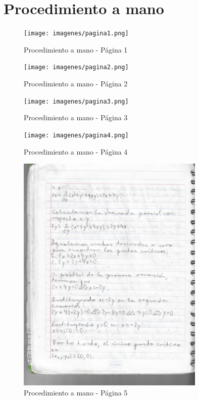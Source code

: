 \documentclass{article}
\begin{document}
\section*{Procedimiento a mano}

\begin{figure}[H]
	\centering
	\texttt{[image: imagenes/pagina1.png]}
	\caption{Procedimiento a mano - Página 1}
	\label{fig:procedimiento_1}
\end{figure}

\begin{figure}[H]
	\centering
	\texttt{[image: imagenes/pagina2.png]}
	\caption{Procedimiento a mano - Página 2}
	\label{fig:procedimiento_2}
\end{figure}

\begin{figure}[H]
	\centering
	\texttt{[image: imagenes/pagina3.png]}
	\caption{Procedimiento a mano - Página 3}
	\label{fig:procedimiento_3}
\end{figure}

\begin{figure}[H]
	\centering
	\texttt{[image: imagenes/pagina4.png]}
	\caption{Procedimiento a mano - Página 4}
	\label{fig:procedimiento_4}
\end{figure}

\begin{figure}[H]
	\centering
	\includegraphics[width=0.8\textwidth]{imagenes/pagina5.png}
	\caption{Procedimiento a mano - Página 5}
	\label{fig:procedimiento_5}
\end{figure}
\end{document}
